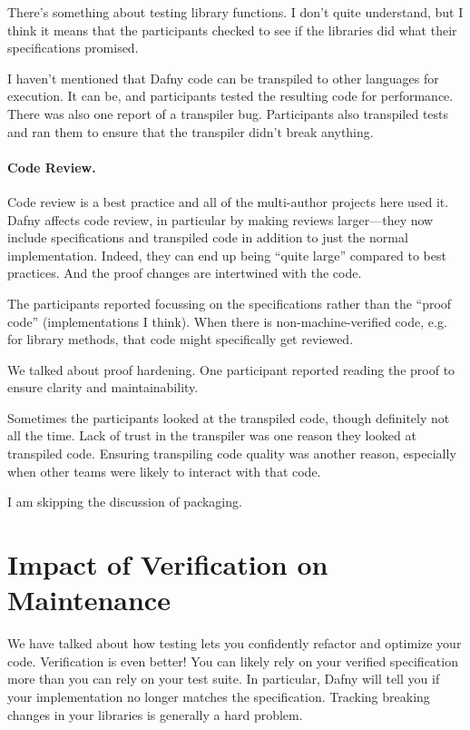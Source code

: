 \documentclass[11pt]{article}
\begin{document}
There's something about testing library functions. I don't quite understand, but I think
it means that the participants checked to see if the libraries did what their specifications
promised.

I haven't mentioned that Dafny code can be transpiled to other languages for execution.
It can be, and participants tested the resulting code for performance. There was also one
report of a transpiler bug. Participants also transpiled tests and ran them to ensure
that the transpiler didn't break anything.

\paragraph{Code Review.} Code review is a best practice and all of the multi-author projects
here used it. Dafny affects code review, in particular by making reviews
larger---they now include specifications and transpiled code in addition to just the normal
implementation. Indeed, they can end up being ``quite large'' compared to best practices.
And the proof changes are intertwined with the code.

The participants reported focussing on the specifications rather than the ``proof code'' (implementations I think). When there is non-machine-verified code, e.g. for library methods, that code might specifically get reviewed.

We talked about proof hardening. One participant reported reading the proof to ensure clarity
and maintainability.

Sometimes the participants looked at the transpiled code, though definitely not all the time.
Lack of trust in the transpiler was one reason they looked at transpiled code. Ensuring transpiling code quality was
another reason, especially when other teams were likely to interact with that code.

I am skipping the discussion of packaging.

\section*{Impact of Verification on Maintenance}
We have talked about how testing lets you confidently refactor and
optimize your code.  Verification is even better! You can likely rely on your verified specification more than
you can rely on your test suite. In particular, Dafny will tell you
if your implementation no longer matches the specification. Tracking
breaking changes in your libraries is generally a hard problem.
\end{document}
